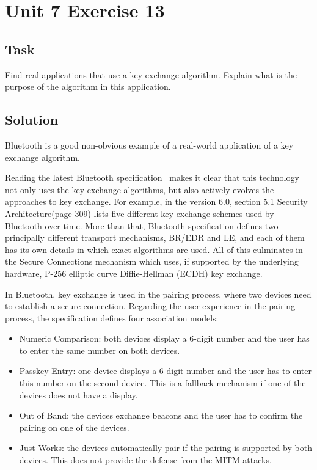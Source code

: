 \section{Unit 7 Exercise 13}

\subsection{Task}
Find real applications that use a key exchange algorithm. Explain
what is the purpose of the algorithm in this application.

\subsection{Solution}

Bluetooth is a good non-obvious example of a real-world application of a key exchange algorithm.

Reading the latest Bluetooth specification~\cite{bluetooth} makes it clear that this technology not only uses the key exchange algorithms, but also actively evolves the approaches to key exchange.
For example, in the version 6.0, section 5.1 Security Architecture(page 309) lists five different key exchange schemes used by Bluetooth over time.
More than that, Bluetooth specification defines two principally different transport mechanisms, BR/EDR and LE, and each of them has its own details in which exact algorithms are used.
All of this culminates in the Secure Connections mechanism which uses, if supported by the underlying hardware, P-256 elliptic curve Diffie-Hellman (ECDH) key exchange.

In Bluetooth, key exchange is used in the pairing process, where two devices need to establish a secure connection.
Regarding the user experience in the pairing process, the specification defines four association models:
\begin{itemize}
    \item Numeric Comparison: both devices display a 6-digit number and the user has to enter the same number on both devices.
    \item Passkey Entry: one device displays a 6-digit number and the user has to enter this number on the second device. This is a fallback mechanism if one of the devices does not have a display.
    \item Out of Band: the devices exchange beacons and the user has to confirm the pairing on one of the devices.
    \item Just Works: the devices automatically pair if the pairing is supported by both devices. This does not provide the defense from the MITM attacks.
\end{itemize}

